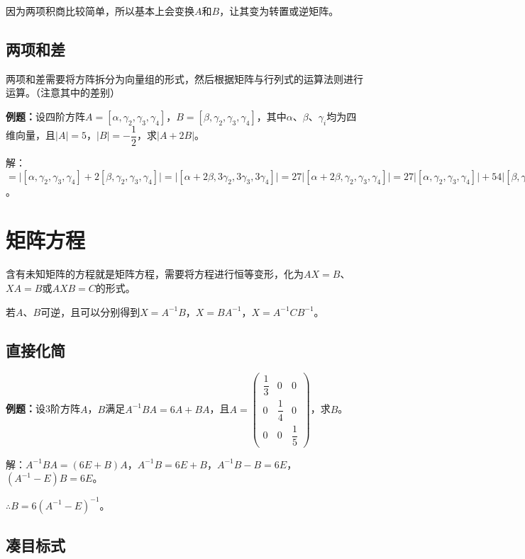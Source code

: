 \documentclass[UTF8, 12pt]{ctexart}
\begin{document}
因为两项积商比较简单，所以基本上会变换$A$和$B$，让其变为转置或逆矩阵。

\subsection{两项和差}

两项和差需要将方阵拆分为向量组的形式，然后根据矩阵与行列式的运算法则进行运算。（注意其中的差别）

\textbf{例题：}设四阶方阵$A=[\alpha,\gamma_2,\gamma_3,\gamma_4]$，$B=[\beta,\gamma_2,\gamma_3,\gamma_4]$，其中$\alpha$、$\beta$、$\gamma_i$均为四维向量，且$\vert A\vert=5$，$\vert B\vert=-\dfrac{1}{2}$，求$\vert A+2B\vert$。

解：$=\vert[\alpha,\gamma_2,\gamma_3,\gamma_4]+2[\beta,\gamma_2,\gamma_3,\gamma_4]\vert=\vert[\alpha+2\beta,3\gamma_2,3\gamma_3,3\gamma_4]\vert=27\vert[\alpha+2\beta,\gamma_2,\gamma_3,\gamma_4]\vert=27\vert[\alpha,\gamma_2,\gamma_3,\gamma_4]\vert+54\vert[\beta,\gamma_2,\gamma_3,\gamma_4]\vert=27(\vert A\vert+2\vert B\vert)=108$。

\section{矩阵方程}

含有未知矩阵的方程就是矩阵方程，需要将方程进行恒等变形，化为$AX=B$、$XA=B$或$AXB=C$的形式。

若$A$、$B$可逆，且可以分别得到$X=A^{-1}B$，$X=BA^{-1}$，$X=A^{-1}CB^{-1}$。

\subsection{直接化简}

\textbf{例题：}设3阶方阵$A$，$B$满足$A^{-1}BA=6A+BA$，且$A=\left(\begin{array}{ccc}
    \dfrac{1}{3} & 0 & 0 \\
    0 & \dfrac{1}{4} & 0 \\
    0 & 0 & \dfrac{1}{5}
\end{array}\right)$，求$B$。

解：$A^{-1}BA=(6E+B)A$，$A^{-1}B=6E+B$，$A^{-1}B-B=6E$，$(A^{-1}-E)B=6E$。

$\therefore B=6(A^{-1}-E)^{-1}$。

\subsection{凑目标式}
\end{document}
